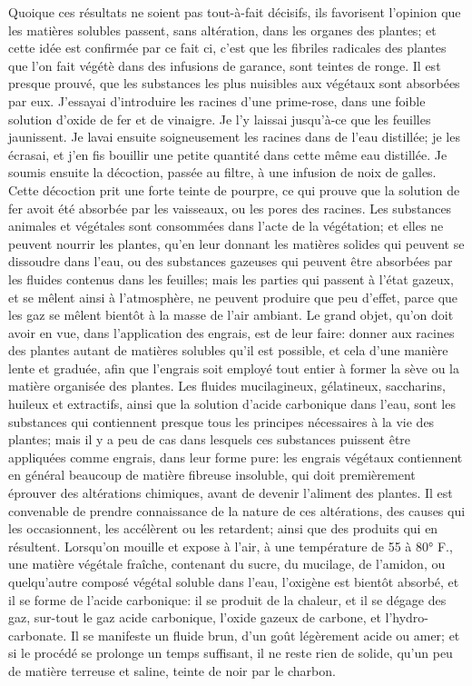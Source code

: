 Quoique ces résultats ne soient pas tout-à-fait décisifs, ils favorisent l'opinion que les matières solubles passent, sans altération, dans les organes des plantes; et cette idée est confirmée par ce fait ci, c'est que les fibriles radicales des plantes que l'on fait végétè dans des infusions de garance, sont teintes\setcounter{page}{149} de ronge. Il est presque prouvé, que les substances les plus nuisibles aux végétaux sont absorbées par eux. J'essayai d'introduire les racines d'une prime-rose, dans une foible solution d'oxide de fer et de vinaigre. Je l'y laissai jusqu'à-ce que les feuilles jaunissent. Je lavai ensuite soigneusement les racines dans de l'eau distillée; je les écrasai, et j'en fis bouillir une petite quantité dans cette même eau distillée. Je soumis ensuite la décoction, passée au filtre, à une infusion de noix de galles. Cette décoction prit une forte teinte de pourpre, ce qui prouve que la solution de fer avoit été absorbée par les vaisseaux, ou les pores des racines. Les substances animales et végétales sont consommées dans l'acte de la végétation; et elles ne peuvent nourrir les plantes, qu'en leur donnant les matières solides qui peuvent se dissoudre dans l'eau, ou des substances gazeuses qui peuvent être absorbées par les fluides contenus dans les feuilles; mais les parties qui passent à l'état gazeux, et se mêlent ainsi à l'atmosphère, ne peuvent produire que peu d'effet, parce que les gaz se mêlent bientôt à la masse de l'air ambiant. Le grand objet, qu'on doit avoir en vue, dans l'application des engrais, est de leur faire:\setcounter{page}{150} donner aux racines des plantes autant de matières solubles qu'il est possible, et cela d'une manière lente et graduée, afin que l'engrais soit employé tout entier à former la sève ou la matière organisée des plantes.
Les fluides mucilagineux, gélatineux, saccharins, huileux et extractifs, ainsi que la solution d'acide carbonique dans l'eau, sont les substances qui contiennent presque tous les principes nécessaires à la vie des plantes; mais il y a peu de cas dans lesquels ces substances puissent être appliquées comme engrais, dans leur forme pure: les engrais végétaux contiennent en général beaucoup de matière fibreuse insoluble, qui doit premièrement éprouver des altérations chimiques, avant de devenir l'aliment des plantes.
Il est convenable de prendre connaissance de la nature de ces altérations, des causes qui les occasionnent, les accélèrent ou les retardent; ainsi que des produits qui en résultent.
Lorsqu'on mouille et expose à l'air, à une température de 55 à 80° F., une matière végétale fraîche, contenant du sucre, du mucilage, de l'amidon, ou quelqu'autre composé végétal soluble dans l'eau, l'oxigène est bientôt absorbé, et il se forme de l'acide carbonique: il se produit de la chaleur, et\setcounter{page}{151} il se dégage des gaz, sur-tout le gaz acide carbonique, l'oxide gazeux de carbone, et l'hydro-carbonate. Il se manifeste un fluide brun, d'un goût légèrement acide ou amer; et si le procédé se prolonge un temps suffisant, il ne reste rien de solide, qu'un peu de matière terreuse et saline, teinte de noir par le charbon.
